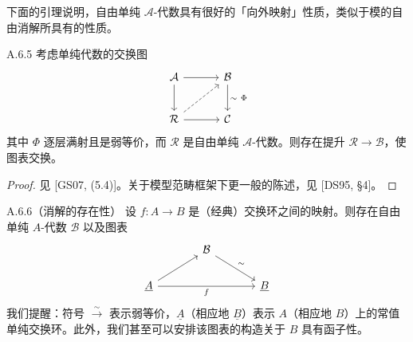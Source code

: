 下面的引理说明，自由单纯 $\mathcal A$-代数具有很好的「向外映射」性质，类似于模的自由消解所具有的性质。

\begin{lem}{A.6.5}\label{thm:a6-07-9}
考虑单纯代数的交换图
\[
\begin{tikzcd}[column sep=3.2em, row sep=2.4em]
\mathcal A \arrow[r] \arrow[d] & \mathcal B \arrow[d, "{\sim}\ \Phi"] \\
\mathcal R \arrow[r] \arrow[ur, dashed] & \mathcal C
\end{tikzcd}
\]
其中 $\Phi$ 逐层满射且是弱等价，而 $\mathcal R$ 是自由单纯 $\mathcal A$-代数。则存在提升 $\mathcal R\to\mathcal B$，使图表交换。
\end{lem}

\begin{proof}
见 [GS07, (5.4)]。关于模型范畴框架下更一般的陈述，见 [DS95, §4]。
\end{proof}

\begin{prop}{A.6.6}（消解的存在性）\label{thm:a6-07-10}
设 $f\colon A\to B$ 是（经典）交换环之间的映射。则存在自由单纯 $A$-代数 $\mathcal B$ 以及图表
\[
\begin{tikzcd}[column sep=3.6em, row sep=1.8em]
& \mathcal B \arrow[dr, "{\sim}"] & \\
\underline A \arrow[ur] \arrow[rr, "f"'] & & \underline B
\end{tikzcd}
\]
我们提醒：符号 $\xrightarrow{\sim}$ 表示弱等价，$\underline A$（相应地 $\underline B$）表示 $A$（相应地 $B$）上的常值单纯交换环。此外，我们甚至可以安排该图表的构造关于 $B$ 具有函子性。
\end{prop}

